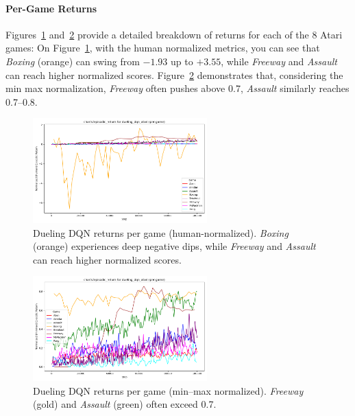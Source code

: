 \paragraph{Per-Game Returns}
Figures~\ref{fig:dueling_return_pergame_human} and~\ref{fig:dueling_return_pergame_minmax} 
provide a detailed breakdown of returns for each of the 8 Atari games:
On Figure~\ref{fig:dueling_return_pergame_human}, with the human normalized metrics, you can see that \emph{Boxing} (orange) can swing from $-1.93$ up to $+3.55$, while \emph{Freeway} and \emph{Assault} can reach higher normalized scores.
Figure~\ref{fig:dueling_return_pergame_minmax} demonstrates that, considering the min max normalization, \emph{Freeway} often pushes above 0.7, \emph{Assault} similarly reaches 0.7--0.8.

\begin{figure}
	\centering
	\includegraphics[width=0.6\textwidth]{figures/dueling_dqn/charts_episodic_return_per_game_human_dueling_dqn_atari.png}
	\caption{Dueling DQN returns per game (human-normalized). 
		\emph{Boxing} (orange) experiences deep negative dips, while \emph{Freeway} and \emph{Assault} can reach higher normalized scores.}
	\label{fig:dueling_return_pergame_human}
\end{figure}

\begin{figure}
	\centering
	\includegraphics[width=0.6\textwidth]{figures/dueling_dqn/charts_episodic_return_per_game_minmax_dueling_dqn_atari.png}
	\caption{Dueling DQN returns per game (min--max normalized). 
		\emph{Freeway} (gold) and \emph{Assault} (green) often exceed 0.7.}
	\label{fig:dueling_return_pergame_minmax}
\end{figure}

